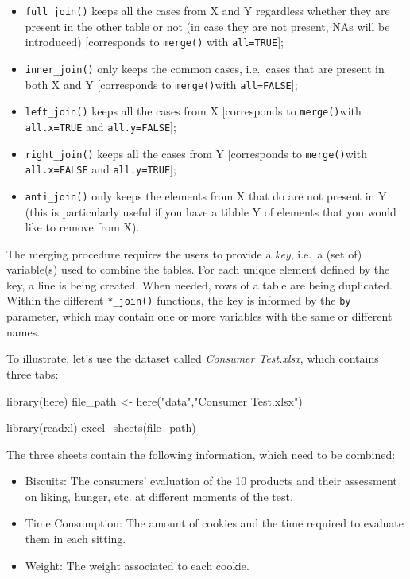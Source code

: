 \documentclass[
]{book}
\newenvironment{Shaded}{\begin{snugshade}}{\end{snugshade}}
\newcommand{\FunctionTok}[1]{\textcolor[rgb]{0.00,0.00,0.00}{#1}}
\newcommand{\NormalTok}[1]{#1}
\newcommand{\OtherTok}[1]{\textcolor[rgb]{0.56,0.35,0.01}{#1}}
\newcommand{\StringTok}[1]{\textcolor[rgb]{0.31,0.60,0.02}{#1}}
\providecommand{\tightlist}{%
  \setlength{\itemsep}{0pt}\setlength{\parskip}{0pt}}
\begin{document}
\begin{itemize}
\tightlist
\item
  \texttt{full\_join()} keeps all the cases from X and Y regardless whether they are present in the other table or not (in case they are not present, NAs will be introduced) {[}corresponds to \texttt{merge()} with \texttt{all=TRUE}{]};
\item
  \texttt{inner\_join()} only keeps the common cases, i.e.~cases that are present in both X and Y {[}corresponds to \texttt{merge()}with \texttt{all=FALSE}{]};
\item
  \texttt{left\_join()} keeps all the cases from X {[}corresponds to \texttt{merge()}with \texttt{all.x=TRUE} and \texttt{all.y=FALSE}{]};
\item
  \texttt{right\_join()} keeps all the cases from Y {[}corresponds to \texttt{merge()}with \texttt{all.x=FALSE} and \texttt{all.y=TRUE}{]};
\item
  \texttt{anti\_join()} only keeps the elements from X that do are not present in Y (this is particularly useful if you have a tibble Y of elements that you would like to remove from X).
\end{itemize}

The merging procedure requires the users to provide a \emph{key}, i.e.~a (set of) variable(s) used to combine the tables. For each unique element defined by the key, a line is being created. When needed, rows of a table are being duplicated. Within the different \texttt{*\_join()} functions, the key is informed by the \texttt{by} parameter, which may contain one or more variables with the same or different names.

To illustrate, let's use the dataset called \emph{Consumer Test.xlsx}, which contains three tabs:

\begin{Shaded}
\begin{Highlighting}[]
\FunctionTok{library}\NormalTok{(here)}
\NormalTok{file\_path }\OtherTok{\textless{}{-}} \FunctionTok{here}\NormalTok{(}\StringTok{"data"}\NormalTok{,}\StringTok{"Consumer Test.xlsx"}\NormalTok{)}

\FunctionTok{library}\NormalTok{(readxl)}
\FunctionTok{excel\_sheets}\NormalTok{(file\_path)}
\end{Highlighting}
\end{Shaded}

The three sheets contain the following information, which need to be combined:

\begin{itemize}
\tightlist
\item
  Biscuits: The consumers' evaluation of the 10 products and their assessment on liking, hunger, etc. at different moments of the test.
\item
  Time Consumption: The amount of cookies and the time required to evaluate them in each sitting.
\item
  Weight: The weight associated to each cookie.
\end{itemize}
\end{document}
